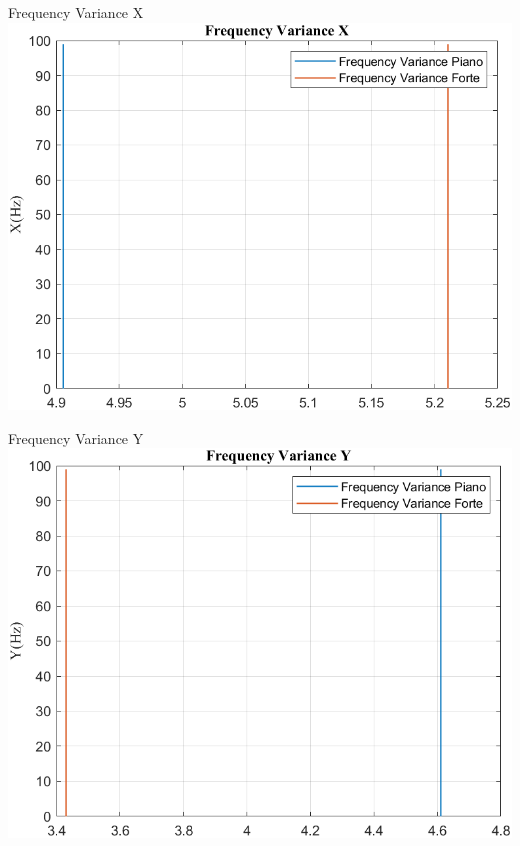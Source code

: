 	\begin{frame}{{Frequency Variance X}}
		\centering\includegraphics[height=.8\textheight]{figure/Mag/Trasformata/Frequency VarianceX}
	\end{frame}
	
	\begin{frame}{{Frequency Variance Y}}
		\centering\includegraphics[height=.8\textheight]{figure/Mag/Trasformata/Frequency VarianceY}
	\end{frame}
	
